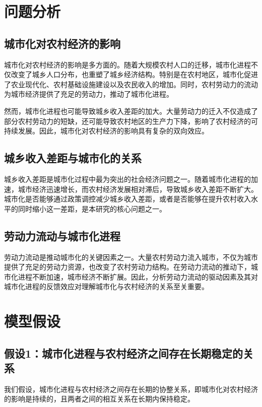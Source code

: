 \documentclass[12pt]{article}
\begin{document}
\newpage

\section{问题分析}

\subsection{城市化对农村经济的影响}
城市化对农村经济的影响是多方面的。随着大规模农村人口的迁移，城市化进程不仅改变了城乡人口分布，也重塑了城乡经济结构。特别是在农村地区，城市化促进了农业现代化、农村基础设施建设以及农民收入的增加。同时，农村劳动力的流动为城市经济提供了充足的劳动力，推动了城市化进程。

然而，城市化进程也可能导致城乡收入差距的加大。大量劳动力的迁入不仅造成了部分农村劳动力的短缺，还可能导致农村地区的生产力下降，影响了农村经济的可持续发展。因此，城市化对农村经济的影响具有复杂的双向效应。

\subsection{城乡收入差距与城市化的关系}
城乡收入差距是城市化过程中最为突出的社会经济问题之一。随着城市化进程的加速，城市经济迅速增长，而农村经济发展相对滞后，导致城乡收入差距不断扩大。城市化是否能够通过政策调控减少城乡收入差距，或者是否能够在提升农村收入水平的同时缩小这一差距，是本研究的核心问题之一。

\subsection{劳动力流动与城市化进程}
劳动力流动是推动城市化的关键因素之一。大量农村劳动力流入城市，不仅为城市提供了充足的劳动力资源，也改变了农村劳动力结构。在劳动力流动的推动下，城市化进程不断加速，城市经济不断扩展。因此，分析劳动力流动的驱动因素及其对城市化进程的反馈效应对理解城市化与农村经济的关系至关重要。

\newpage

\section{模型假设}

\subsection{假设1：城市化进程与农村经济之间存在长期稳定的关系}
我们假设，城市化进程与农村经济之间存在长期的协整关系，即城市化对农村经济的影响是持续的，且两者之间的相互关系在长期内保持稳定。
\end{document}
